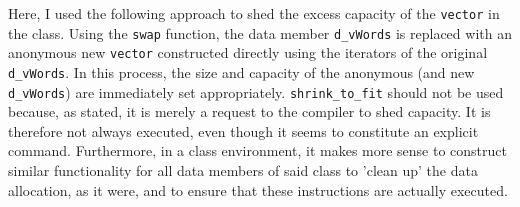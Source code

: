 Here, I used the following approach to shed the excess capacity of the \texttt{vector} in the class. Using the \texttt{swap} function, the data member \texttt{d\_vWords} is replaced with an anonymous new \texttt{vector} constructed directly using the iterators of the original \texttt{d\_vWords}. In this process, the size and capacity of the anonymous (and new \texttt{d\_vWords}) are immediately set appropriately.
\texttt{shrink\_to\_fit} should not be used because, as stated, it is merely a request to the compiler to shed capacity. It is therefore not always executed, even though it seems to constitute an explicit command. Furthermore, in a class environment, it makes more sense to construct similar functionality for all data members of said class to 'clean up' the data allocation, as it were, and to ensure that these instructions are actually executed.
